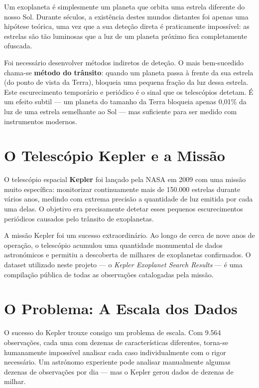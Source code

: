 \documentclass[12pt, a4paper]{report}
\begin{document}
Um exoplaneta é simplesmente um planeta que orbita uma estrela diferente do nosso Sol. Durante séculos, a existência destes mundos distantes foi apenas uma hipótese teórica, uma vez que a sua deteção direta é praticamente impossível: as estrelas são tão luminosas que a luz de um planeta próximo fica completamente ofuscada.

Foi necessário desenvolver métodos indiretos de deteção. O mais bem-sucedido chama-se \textbf{método do trânsito}: quando um planeta passa à frente da sua estrela (do ponto de vista da Terra), bloqueia uma pequena fração da luz dessa estrela. Este escurecimento temporário e periódico é o sinal que os telescópios detetam. É um efeito subtil — um planeta do tamanho da Terra bloqueia apenas 0,01\% da luz de uma estrela semelhante ao Sol — mas suficiente para ser medido com instrumentos modernos.

\section{O Telescópio Kepler e a Missão}

O telescópio espacial \textbf{Kepler} foi lançado pela NASA em 2009 com uma missão muito específica: monitorizar continuamente mais de 150.000 estrelas durante vários anos, medindo com extrema precisão a quantidade de luz emitida por cada uma delas. O objetivo era precisamente detetar esses pequenos escurecimentos periódicos causados pelo trânsito de exoplanetas.

A missão Kepler foi um sucesso extraordinário. Ao longo de cerca de nove anos de operação, o telescópio acumulou uma quantidade monumental de dados astronómicos e permitiu a descoberta de milhares de exoplanetas confirmados. O dataset utilizado neste projeto — o \textit{Kepler Exoplanet Search Results} — é uma compilação pública de todas as observações catalogadas pela missão.

\section{O Problema: A Escala dos Dados}

O sucesso do Kepler trouxe consigo um problema de escala. Com 9.564 observações, cada uma com dezenas de características diferentes, torna-se humanamente impossível analisar cada caso individualmente com o rigor necessário. Um astrónomo experiente pode analisar manualmente algumas dezenas de observações por dia — mas o Kepler gerou dados de dezenas de milhar.
\end{document}
